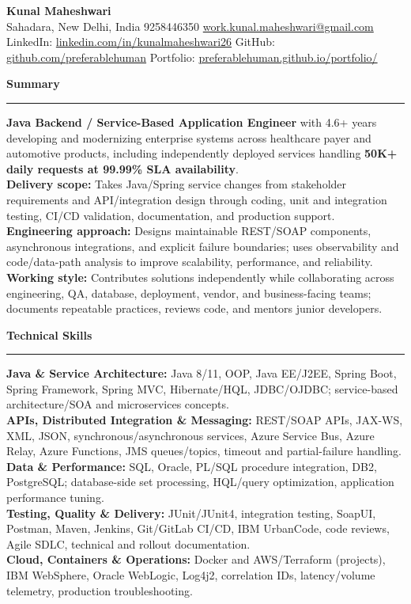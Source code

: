 \documentclass[11pt,letterpaper]{article}
\newcommand{\ressection}[1]{\Needspace{6\baselineskip}\vspace{8pt}\par\textbf{#1}\par\vspace{2pt}\hrule\vspace{5pt}}
\begin{document}
\pagestyle{empty}\raggedright\fontsize{11}{12.5}\selectfont

{\Large \textbf{Kunal Maheshwari}}\\
Sahadara, New Delhi, India \textbar{} 9258446350 \textbar{} \href{mailto:work.kunal.maheshwari@gmail.com}{work.kunal.maheshwari@gmail.com}\\
LinkedIn: \href{https://www.linkedin.com/in/kunalmaheshwari26}{linkedin.com/in/kunalmaheshwari26} \textbar{} GitHub: \href{https://github.com/preferablehuman}{github.com/preferablehuman} \textbar{} Portfolio: \href{https://preferablehuman.github.io/portfolio/}{preferablehuman.github.io/portfolio/}

\ressection{Summary}
\textbf{Java Backend / Service-Based Application Engineer} with 4.6+ years developing and modernizing enterprise systems across healthcare payer and automotive products, including independently deployed services handling \textbf{50K+ daily requests at 99.99\% SLA availability}.\\[2pt]
\textbf{Delivery scope:} Takes Java/Spring service changes from stakeholder requirements and API/integration design through coding, unit and integration testing, CI/CD validation, documentation, and production support.\\[2pt]
\textbf{Engineering approach:} Designs maintainable REST/SOAP components, asynchronous integrations, and explicit failure boundaries; uses observability and code/data-path analysis to improve scalability, performance, and reliability.\\[2pt]
\textbf{Working style:} Contributes solutions independently while collaborating across engineering, QA, database, deployment, vendor, and business-facing teams; documents repeatable practices, reviews code, and mentors junior developers.

\ressection{Technical Skills}
\textbf{Java \& Service Architecture:} Java 8/11, OOP, Java EE/J2EE, Spring Boot, Spring Framework, Spring MVC, Hibernate/HQL, JDBC/OJDBC; service-based architecture/SOA and microservices concepts.\\
\textbf{APIs, Distributed Integration \& Messaging:} REST/SOAP APIs, JAX-WS, XML, JSON, synchronous/asynchronous services, Azure Service Bus, Azure Relay, Azure Functions, JMS queues/topics, timeout and partial-failure handling.\\
\textbf{Data \& Performance:} SQL, Oracle, PL/SQL procedure integration, DB2, PostgreSQL; database-side set processing, HQL/query optimization, application performance tuning.\\
\textbf{Testing, Quality \& Delivery:} JUnit/JUnit4, integration testing, SoapUI, Postman, Maven, Jenkins, Git/GitLab CI/CD, IBM UrbanCode, code reviews, Agile SDLC, technical and rollout documentation.\\
\textbf{Cloud, Containers \& Operations:} Docker and AWS/Terraform (projects), IBM WebSphere, Oracle WebLogic, Log4j2, correlation IDs, latency/volume telemetry, production troubleshooting.
\end{document}
